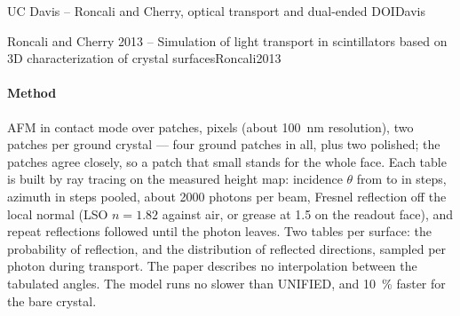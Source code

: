 \begin{programnote}{UC Davis -- Roncali and Cherry, optical transport and dual-ended DOI}{Davis}
\begin{papernote}{Roncali and Cherry 2013 -- Simulation of light transport in scintillators based on 3D characterization of crystal surfaces}{Roncali2013}
\paragraph{Method}
AFM in contact mode over  patches,
 pixels (about \qty{100}{\nano\metre} resolution), two
patches per ground crystal --- four ground patches in all, plus two polished; the patches agree closely, so a
patch that small stands for the whole face. Each table is built by ray
tracing on the measured height map: incidence $\theta$ from  to
 in  steps, azimuth in  steps pooled, about
2000 photons per beam, Fresnel reflection off the local normal (LSO
$n = 1.82$ against air, or grease at 1.5 on the readout face), and repeat
reflections followed until the photon leaves. Two tables per surface: the
probability of reflection, and the distribution of reflected directions,
sampled per photon during transport. The paper describes no interpolation
between the tabulated angles. The model runs no slower than UNIFIED, and
\qty{10}{\percent} faster for the bare  crystal.


\end{papernote}
\end{programnote}
